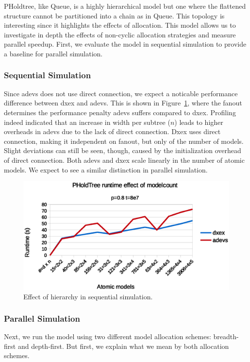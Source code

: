 PHoldtree, like Queue, is a highly hierarchical model but one where the flattened structure cannot be partitioned into a chain as in Queue.
This topology is interesting since it highlights the effects of allocation.
This model allows us to investigate in depth the effects of non-cyclic allocation strategies and measure parallel speedup.
First, we evaluate the model in sequential simulation to provide a baseline for parallel simulation.

\subsubsection{Sequential Simulation}
Since adevs does not use direct connection, we expect a noticable performance difference between dxex and adevs.
This is shown in Figure~\ref{fig:PHOLDtree_seq_dn_benchmark}, where the fanout determines the performance penalty adevs suffers compared to dxex.
Profiling indeed indicated that an increase in width per subtree ($n$) leads to higher overheads in adevs due to the lack of direct connection.
Dxex uses direct connection, making it independent on fanout, but only of the number of models.
Slight deviations can still be seen, though, caused by the initialization overhead of direct connection.
Both adevs and dxex scale linearly in the number of atomic models.
We expect to see a similar distinction in parallel simulation.

\begin{figure}
    \center
    \includegraphics[width=\columnwidth]{fig/pholdtree_sequential_dn.eps}
    \caption{Effect of hierarchy in sequential simulation.}
    \label{fig:PHOLDtree_seq_dn_benchmark}
\end{figure}

\subsubsection{Parallel Simulation}
Next, we run the model using two different model allocation schemes: breadth-first and depth-first.
But first, we explain what we mean by both allocation schemes.

